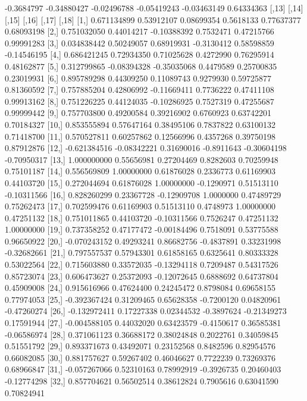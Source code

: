 \documentclass[a4paper,11pt]{scrartcl}
\begin{document}
\begin{Schunk}
\begin{Soutput}
[34,] -0.3684797 -0.34880427 -0.02496788 -0.05419243 -0.03463149  0.64334363
             [,13]       [,14]       [,15]      [,16]       [,17]       [,18]
 [1,]  0.671134899  0.53912107  0.08699354  0.5618133  0.77637377  0.68093198
 [2,]  0.751032050  0.44014217 -0.10388392  0.7532471  0.47215766  0.99991283
 [3,]  0.034838442  0.50249057  0.68919931 -0.3130412  0.58598859 -0.14546195
 [4,]  0.686421245  0.72934350  0.71025628  0.4272990  0.76295914  0.48162877
 [5,]  0.312799865 -0.08394328 -0.35035068  0.4479589  0.25700835  0.23019931
 [6,]  0.895789298  0.44309250  0.11089743  0.9279930  0.59725877  0.81360592
 [7,]  0.757885204  0.42806992 -0.11669411  0.7736222  0.47411108  0.99913162
 [8,]  0.751226225  0.44124035 -0.10286925  0.7527319  0.47255687  0.99999442
 [9,]  0.757703800  0.49200584  0.39216902  0.6760923  0.63742201  0.70184327
[10,]  0.853555894  0.57647164  0.38495106  0.7837822  0.63100132  0.71418700
[11,]  0.570527811  0.60257862  0.12566996  0.4357268  0.39750198  0.87912876
[12,] -0.621384516 -0.08342221  0.31690016 -0.8911643 -0.30604198 -0.70950317
[13,]  1.000000000  0.55656981  0.27204469  0.8282603  0.70259948  0.75101187
[14,]  0.556569809  1.00000000  0.61876028  0.2336773  0.61169903  0.44103720
[15,]  0.272044694  0.61876028  1.00000000 -0.1290971  0.51513110 -0.10311566
[16,]  0.828260299  0.23367728 -0.12909708  1.0000000  0.47489729  0.75262473
[17,]  0.702599476  0.61169903  0.51513110  0.4748973  1.00000000  0.47251132
[18,]  0.751011865  0.44103720 -0.10311566  0.7526247  0.47251132  1.00000000
[19,]  0.737358252  0.47177472 -0.00184496  0.7518091  0.53775588  0.96650922
[20,] -0.070243152  0.49293241  0.86682756 -0.4837891  0.33231998 -0.32682661
[21,]  0.797557537  0.57943301  0.61858165  0.6325641  0.80333328  0.53022564
[22,]  0.715603880  0.33572035 -0.13294118  0.7209487  0.54317526  0.85723074
[23,]  0.606473627  0.25372093 -0.12072645  0.6888692  0.64737804  0.45909008
[24,]  0.915616966  0.47624400  0.24245472  0.8798084  0.69658155  0.77974053
[25,] -0.392367424  0.31209465  0.65628358 -0.7200120  0.04820961 -0.47260274
[26,] -0.132972411  0.17227338  0.02344532 -0.3897624 -0.21349273  0.17591944
[27,] -0.004588105  0.44032020  0.63423579 -0.4150617  0.36585381 -0.06586974
[28,]  0.371061123  0.36688172  0.38024848  0.2022761  0.34059845  0.51551792
[29,]  0.893371673  0.43492071  0.23152568  0.8482596  0.82954576  0.66082085
[30,]  0.881757627  0.59267402  0.46046627  0.7722239  0.73269376  0.68966847
[31,] -0.057267066  0.52310163  0.78992919 -0.3926735  0.20460403 -0.12774298
[32,]  0.857704621  0.56502514  0.38612824  0.7905616  0.63041590  0.70824941

\end{Soutput}
\end{Schunk}
\end{document}
